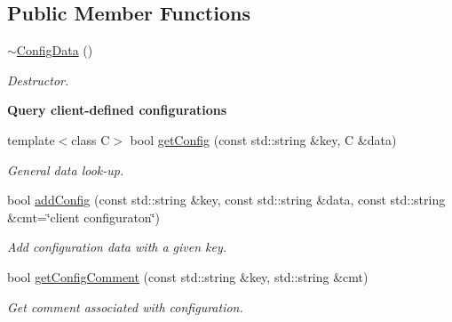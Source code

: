 \subsection*{Public Member Functions}
\begin{CompactItemize}
\item 
\hypertarget{classConfiguration_1_1ConfigData_2ecc5cc843312e6f724f412d9b894971}{
\hyperlink{classConfiguration_1_1ConfigData_2ecc5cc843312e6f724f412d9b894971}{$\sim$Config\-Data} ()}
\label{classConfiguration_1_1ConfigData_2ecc5cc843312e6f724f412d9b894971}

\begin{CompactList}\small\item\em Destructor. \item\end{CompactList}\end{CompactItemize}
\begin{Indent}{\bf Query client-defined configurations}\par
\begin{CompactItemize}
\item 
template$<$class C$>$ bool \hyperlink{classConfiguration_1_1ConfigData_6d0a1579cc1c75a659a43b1644977b57}{get\-Config} (const std::string \&key, C \&data)
\begin{CompactList}\small\item\em General data look-up. \item\end{CompactList}\item 
bool \hyperlink{classConfiguration_1_1ConfigData_02a4f9464ec6ef54ecb0d5ab622510d5}{add\-Config} (const std::string \&key, const std::string \&data, const std::string \&cmt=\char`\"{}client configuraton\char`\"{})
\begin{CompactList}\small\item\em Add configuration data with a given key. \item\end{CompactList}\item 
bool \hyperlink{classConfiguration_1_1ConfigData_bd01c225b3645f43d42a743128ef8a44}{get\-Config\-Comment} (const std::string \&key, std::string \&cmt)
\begin{CompactList}\small\item\em Get comment associated with configuration. \item\end{CompactList}\end{CompactItemize}
\end{Indent}

